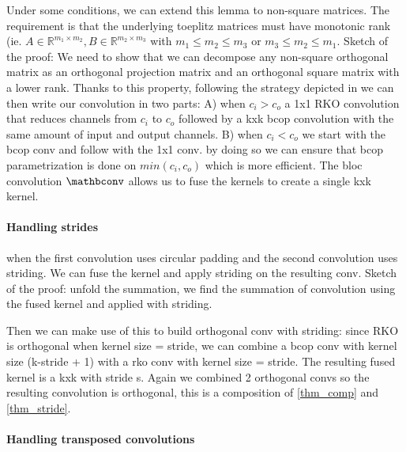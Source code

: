             
            Under some conditions, we can extend this lemma to non-square matrices. The requirement is that the underlying toeplitz matrices must have monotonic rank (ie. $A \in \mathbb{R}^{m_1\times m_2}, B \in \mathbb{R}^{m_2\times m_3}$ with $m_1 \leq m_2 \leq m_3$ or $m_3 \leq m_2 \leq m_1$. Sketch of the proof: We need to show that we can decompose any non-square orthogonal matrix as an orthogonal projection matrix and an orthogonal square matrix with a lower rank.
            Thanks to this property, following the strategy depicted in \cite{senderovich2022towards} we can then write our convolution in two parts: 
            A) when $c_i > c_o $ a 1x1 RKO convolution that reduces channels from $c_i$ to $c_o$ followed by a kxk bcop convolution with the same amount of input and output channels.
            B) when $c_i < c_o$ we start with the bcop conv and follow with the 1x1 conv.
            by doing so we can ensure that bcop parametrization is done on $min(c_i,c_o)$ which is more efficient. The bloc convolution $\mathbconv$ allows us to fuse the kernels to create a single kxk kernel.

        \paragraph{Handling strides}

        \begin{theorem}\label{thm_stride} when the first convolution uses circular padding and the second convolution uses striding. We can fuse the kernel and apply striding on the resulting conv. Sketch of the proof: unfold the summation, we find the summation of convolution using the fused kernel and applied with striding. 
        \end{theorem}

        Then we can make use of this to build orthogonal conv with striding: since RKO is orthogonal when kernel size = stride, we can combine a bcop conv with kernel size (k-stride + 1) with a rko conv with kernel size = stride. The resulting fused kernel is a kxk with stride s. Again we combined 2 orthogonal convs so the resulting convolution is orthogonal, this is a composition of \ref{thm_comp} and \ref{thm_stride}.

        \paragraph{Handling transposed convolutions} 
        
